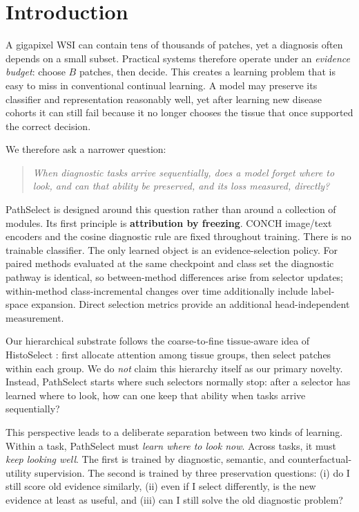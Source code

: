 \documentclass{article}
\begin{document}
\section{Introduction}
\label{sec:intro}

A gigapixel WSI can contain tens of thousands of patches, yet a diagnosis often depends on a small subset.
Practical systems therefore operate under an \emph{evidence budget}: choose $B$ patches, then decide.
This creates a learning problem that is easy to miss in conventional continual learning.
A model may preserve its classifier and representation reasonably well, yet after learning new disease cohorts it can still fail because it no longer chooses the tissue that once supported the correct decision.

We therefore ask a narrower question:
\begin{quote}
\emph{When diagnostic tasks arrive sequentially, does a model forget where to look, and can that ability be preserved, and its loss measured, directly?}
\end{quote}
PathSelect is designed around this question rather than around a collection of modules.
Its first principle is \textbf{attribution by freezing}.
CONCH image/text encoders \cite{lu2024conch} and the cosine diagnostic rule are fixed throughout training.
There is no trainable classifier.
The only learned object is an evidence-selection policy.
For paired methods evaluated at the same checkpoint and class set the diagnostic pathway is identical, so between-method differences arise from selector updates; within-method class-incremental changes over time additionally include label-space expansion. Direct selection metrics provide an additional head-independent measurement.

Our hierarchical substrate follows the coarse-to-fine tissue-aware idea of HistoSelect \cite{huang2026histoselect}: first allocate attention among tissue groups, then select patches within each group.
We do \emph{not} claim this hierarchy itself as our primary novelty.
Instead, PathSelect starts where such selectors normally stop: after a selector has learned where to look, how can one keep that ability when tasks arrive sequentially?

This perspective leads to a deliberate separation between two kinds of learning.
Within a task, PathSelect must \emph{learn where to look now}.
Across tasks, it must \emph{keep looking well}.
The first is trained by diagnostic, semantic, and counterfactual-utility supervision.
The second is trained by three preservation questions: (i) do I still score old evidence similarly, (ii) even if I select differently, is the new evidence at least as useful, and (iii) can I still solve the old diagnostic problem?
\end{document}
